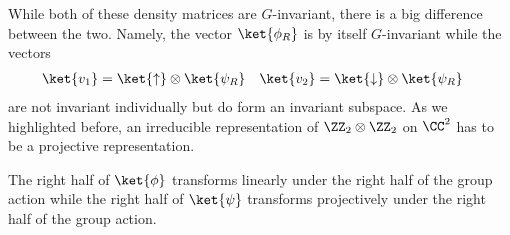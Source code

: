 While both of these density matrices are $G$-invariant, there is a big difference between the two. Namely, the vector $\ket{\phi_R}$ is by itself $G$-invariant while the vectors
\begin{align}
\ket{v_1}&=\ket{\uparrow}\otimes\ket{\psi_R}&\ket{v_2}&=\ket{\downarrow}\otimes\ket{\psi_R}
\end{align}
are not invariant individually but do form an invariant subspace. As we highlighted before, an irreducible representation of $\ZZ_2\otimes\ZZ_2$ on $\CC^2$ has to be a projective representation.
\begin{conclusion}
	The right half of $\ket{\phi}$ transforms linearly under the right half of the group action while the right half of $\ket{\psi}$ transforms projectively under the right half of the group action.
\end{conclusion}
